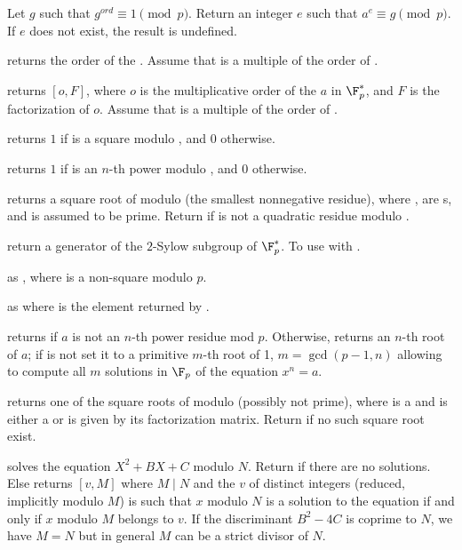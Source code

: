  Let $g$ such that
$g^{ord} \equiv 1 \pmod{p}$. Return an integer $e$ such that
$a^e \equiv g \pmod{p}$. If $e$ does not exist, the result is undefined.

 returns the order of the
 . Assume that  is a multiple of the order of
.

 returns $[o,F]$, where $o$
is the multiplicative order of the  $a$ in $\F_p^*$, and $F$ is the
factorization of $o$. Assume that  is a multiple of the order of
.

 returns $1$ if  is a square
modulo , and $0$ otherwise.

 returns $1$ if  is an
$n$-th power modulo , and $0$ otherwise.

 returns a square root of  modulo
 (the smallest nonnegative residue), where ,  are
s, and  is assumed to be prime. Return 
if  is not a quadratic residue modulo .

 return a generator of
the $2$-Sylow subgroup of $\F_p^*$. To use with .

 as , where  is a
non-square modulo $p$.

as  where  is the element returned by
.

returns  if $a$ is not an $n$-th power residue mod $p$.
Otherwise, returns an $n$-th root of $a$; if  is not 
set it to a primitive $m$-th root of 1, $m = \gcd(p-1,n)$ allowing to compute
all $m$ solutions in $\F_p$ of the equation $x^n = a$.

 returns one of the square roots of 
modulo  (possibly not prime), where  is a  and 
is either a  or is given by its factorization matrix.  Return
 if no such square root exist.

 solves the equation $X^2 + B X
+ C$ modulo $N$. Return  if there are no solutions. Else returns
 $[v, M]$ where $M \mid N$ and the  $v$ of distinct integers
(reduced, implicitly modulo $M$) is such that $x$ modulo $N$ is a solution to
the equation if and only if $x$ modulo $M$ belongs to $v$. If the
discriminant $B^2-4C$ is coprime to $N$, we have $M = N$ but in general $M$
can be a strict divisor of $N$.

